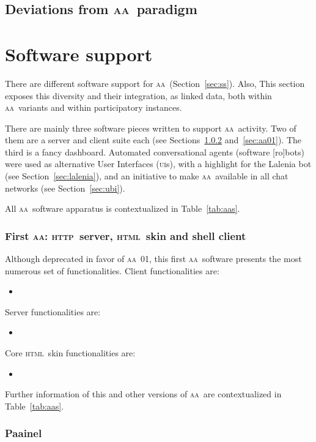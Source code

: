 \documentclass[a4paper, 11pt]{article} %
\newcommand{\httpb}{\textsc{http}}
\newcommand{\html}{\textsc{html}}
\newcommand{\aab}{\textsc{aa}}
\newcommand{\paaineli}{P{\bf \sc aa}inel}
\newcommand{\ui}{\textsc{ui}}
\begin{document}
\subsection{Deviations from \aab\ paradigm}\label{sec:devia}

 \section{Software support}\label{sec:sofsup}
 There are different software support for \aab\ (Section~\ref{sec:ss}). Also,  This section exposes this diversity and their integration, as linked data, both within \aab\ variants and within participatory instances.

There are mainly three software pieces written to support \aab\ activity. Two of them are a server and client suite each (see Sections~\ref{sec:aaFirst} and~\ref{sec:aa01}). The third is a fancy dashboard. Automated conversational agents (software [ro]bots) were used as alternative User Interfaces (\ui s), with a highlight for the Lalenia bot (see Section~\ref{sec:lalenia}), and an initiative to make \aab\ available in all chat networks (see Section~\ref{sec:ubi}).

All \aab\ software apparatus is contextualized in Table~\ref{tab:aas}.
\subsubsection{First \aab: \httpb\ server, \html\ skin and shell client}\label{sec:aaFirst}
Although deprecated in favor of \aab\ 01, this first \aab\ software presents the most numerous set of functionalities. Client functionalities are:
\begin{itemize}
    \item 
\end{itemize}

Server functionalities are:
\begin{itemize}
    \item
\end{itemize}

Core \html\ skin functionalities are:
\begin{itemize}
    \item
\end{itemize}


Further information of this and other versions of \aab\ are contextualized in Table~\ref{tab:aas}.
\subsubsection{\paaineli}\label{sec:aaFirst}
\end{document}

